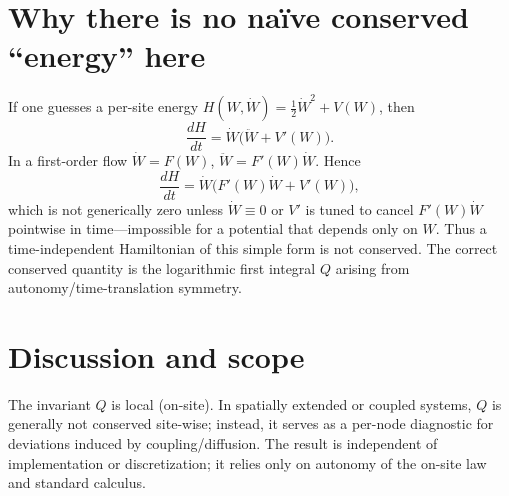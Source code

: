 \documentclass[11pt]{article}
\begin{document}

\section{Why there is no na\"{i}ve conserved ``energy'' here}
If one guesses a per-site energy $H(W,\dot W)=\tfrac12 \dot W^2 + V(W)$, then
\[
\frac{dH}{dt}=\dot W\big(\ddot W + V'(W)\big).
\]
In a first-order flow $\dot W=F(W)$, $\ddot W=F'(W)\dot W$. Hence
\[
\frac{dH}{dt}=\dot W\big(F'(W)\dot W + V'(W)\big),
\]
which is not generically zero unless $\dot W\equiv 0$ or $V'$ is tuned to cancel $F'(W)\dot W$ pointwise in time---impossible for a potential that depends only on $W$. Thus a time-independent Hamiltonian of this simple form is not conserved. The correct conserved quantity is the logarithmic first integral $Q$ arising from autonomy/time-translation symmetry.

\section{Discussion and scope}
The invariant $Q$ is local (on-site). In spatially extended or coupled systems, $Q$ is generally not conserved site-wise; instead, it serves as a per-node diagnostic for deviations induced by coupling/diffusion. The result is independent of implementation or discretization; it relies only on autonomy of the on-site law and standard calculus.
\end{document}
